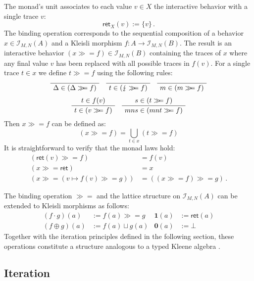 \documentclass[acmsmall,timestamp,review,anonymous]{acmart}
\newcommand{\kw}[1]{\ensuremath{ \mathsf{#1} }}
\newcommand{\bind}{\gg\!\!=}
\begin{document}
The monad's unit associates to each value $v \in X$
the interactive behavior with a single trace $v$:
\[
    \kw{ret}_X(v) := \{ v \} \,.
\]
The binding operation corresponds to
the sequential composition of
a behavior $x \in \mathcal{I}_{M,N}(A)$ and
a Kleisli morphism $f : A \rightarrow \mathcal{I}_{M,N}(B)$.
The result is an interactive behavior
$(x \bind f) \in \mathcal{I}_{M,N}(B)$
containing the traces of $x$ where
any final value $v$ has been replaced with
all possible traces in $f(v)$.
For a single trace $t \in x$ we define $t \bind f$
using the following rules:
\begin{gather*}
  \AxiomC{}
  \UnaryInfC{$\Delta \in (\Delta \bind f)$}
  \DisplayProof
  \quad
  \AxiomC{}
  \UnaryInfC{$t \in (\lightning \bind f)$}
  \DisplayProof
  \quad
  \AxiomC{}
  \UnaryInfC{$m \in (m \bind f)$}
  \DisplayProof
  \\[1ex]
  \AxiomC{$t \in f(v)$}
  \UnaryInfC{$t \in (v \bind f)$}
  \DisplayProof
  \quad
  \AxiomC{$s \in (t \bind f)$}
  \UnaryInfC{$mns \in (mnt \bind f)$}
  \DisplayProof
\end{gather*}
Then $x \bind f$ can be defined as:
\[
    (x \bind f) = \bigcup_{t \in x} (t \bind f)
\]
It is straightforward to verify that
the monad laws hold:
\begin{align*}
  (\kw{ret}(v) \bind f) &= f(v) \\
  (x \bind \kw{ret}) &= x \\
  (x \bind (v \mapsto f(v) \bind g)) &= ((x \bind f) \bind g) \,.
\end{align*}

The binding operation $\bind$
and the lattice structure on $\mathcal{I}_{M,N}(A)$
can be extended to Kleisli morphisms as follows:
\begin{align*}
    (f \cdot g)(a) &:= f(a) \bind g &
    \mathbf{1}(a) &:= \kw{ret}(a) \\
    (f \oplus g)(a) &:= f(a) \sqcup g(a) &
    \mathbf{0}(a) &:= \bot
\end{align*}
Together with the iteration principles
defined in the following section,
these operations constitute a structure
analogous to a typed Kleene algebra \cite{tka}.


\subsection{Iteration} \label{sec:monad:iter} %
\end{document}
